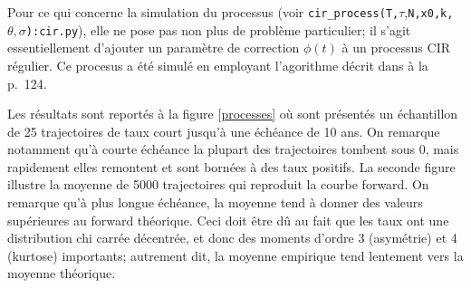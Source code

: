 \begin{table}
  \centering
  \caption{}
  \label{cir_table}
  
\end{table}

Pour ce qui concerne la simulation du processus (voir
\verb+cir_process(T,+$\tau$,\verb+N,x0,k,+$\theta,\sigma$\verb+):cir.py+), elle ne pose pas non
plus de problème particulier; il s'agit essentiellement d'ajouter un paramètre de
correction $\phi(t)$ à un processus CIR régulier. Ce procesus a été simulé en employant
l'agorithme décrit dans \cite{glasserman} à la p.~124.

Les résultats sont reportés à la figure \ref{processes} où sont présentés un échantillon
de 25 trajectoires de taux court jusqu'à une échéance de 10 ans. On remarque notamment
qu'à courte échéance la plupart des trajectoires tombent sous 0, mais rapidement elles
remontent et sont bornées à des taux positifs. La seconde figure illustre la moyenne de
5000 trajectoires qui reproduit la courbe forward. On remarque qu'à plus longue échéance,
la moyenne tend à donner des valeurs supérieures au forward théorique. Ceci doit être dû
au fait que les taux ont une distribution chi carrée décentrée, et donc des moments
d'ordre 3 (asymétrie) et 4 (kurtose) importants; autrement dit, la moyenne empirique tend
lentement vers la moyenne théorique. 

